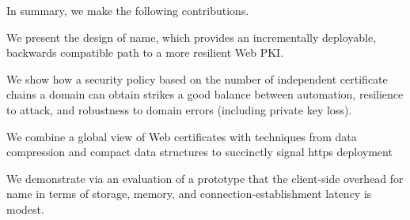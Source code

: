 In summary, we make the following contributions.
\begin{compactitem}
\item We present the design of \ac{name}, which provides an incrementally deployable,
      backwards compatible path to a more resilient Web PKI.
\item We show how a security policy based on the number of independent certificate chains
      a domain can obtain strikes a good balance between automation, 
      resilience to attack, and robustness to domain errors (including private key loss).
\item We combine a global view of Web certificates with techniques from data
      compression and compact data structures to succinctly signal \ac{https} deployment
\item We demonstrate via an evaluation of a prototype that the client-side overhead for
      \ac{name} in terms of storage, memory, and connection-establishment latency is
      modest. 
\end{compactitem}

